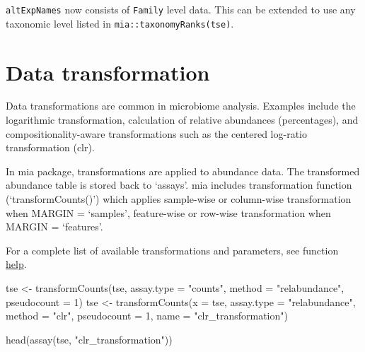 \documentclass[
]{book}
\newenvironment{Shaded}{\begin{snugshade}}{\end{snugshade}}
\newcommand{\AttributeTok}[1]{\textcolor[rgb]{0.77,0.63,0.00}{#1}}
\newcommand{\DecValTok}[1]{\textcolor[rgb]{0.00,0.00,0.81}{#1}}
\newcommand{\FunctionTok}[1]{\textcolor[rgb]{0.00,0.00,0.00}{#1}}
\newcommand{\NormalTok}[1]{#1}
\newcommand{\OtherTok}[1]{\textcolor[rgb]{0.56,0.35,0.01}{#1}}
\newcommand{\StringTok}[1]{\textcolor[rgb]{0.31,0.60,0.02}{#1}}
\begin{document}
\texttt{altExpNames} now consists of \texttt{Family} level data. This can be extended to use
any taxonomic level listed in \texttt{mia::taxonomyRanks(tse)}.

\hypertarget{assay-transform}{%
\section{Data transformation}\label{assay-transform}}

Data transformations are common in microbiome analysis. Examples
include the logarithmic transformation, calculation of relative
abundances (percentages), and compositionality-aware transformations
such as the centered log-ratio transformation (clr).

In mia package, transformations are applied to abundance data. The transformed
abundance table is stored back to `assays'. mia includes transformation
function (`transformCounts()') which applies sample-wise or column-wise transformation when MARGIN = `samples', feature-wise or row-wise transformation when MARGIN = `features'.

For a complete list of available transformations and parameters, see function
\href{https://microbiome.github.io/mia/reference/transformCounts.html}{help}.

\begin{Shaded}
\begin{Highlighting}[]
\NormalTok{tse }\OtherTok{\textless{}{-}} \FunctionTok{transformCounts}\NormalTok{(tse, }\AttributeTok{assay.type =} \StringTok{"counts"}\NormalTok{, }\AttributeTok{method =} \StringTok{"relabundance"}\NormalTok{, }\AttributeTok{pseudocount =} \DecValTok{1}\NormalTok{)}
\NormalTok{tse }\OtherTok{\textless{}{-}} \FunctionTok{transformCounts}\NormalTok{(}\AttributeTok{x =}\NormalTok{ tse, }\AttributeTok{assay.type =} \StringTok{"relabundance"}\NormalTok{, }\AttributeTok{method =} \StringTok{"clr"}\NormalTok{, }
                        \AttributeTok{pseudocount =} \DecValTok{1}\NormalTok{, }\AttributeTok{name =} \StringTok{"clr\_transformation"}\NormalTok{)}

\FunctionTok{head}\NormalTok{(}\FunctionTok{assay}\NormalTok{(tse, }\StringTok{"clr\_transformation"}\NormalTok{))}
\end{Highlighting}
\end{Shaded}
\end{document}
